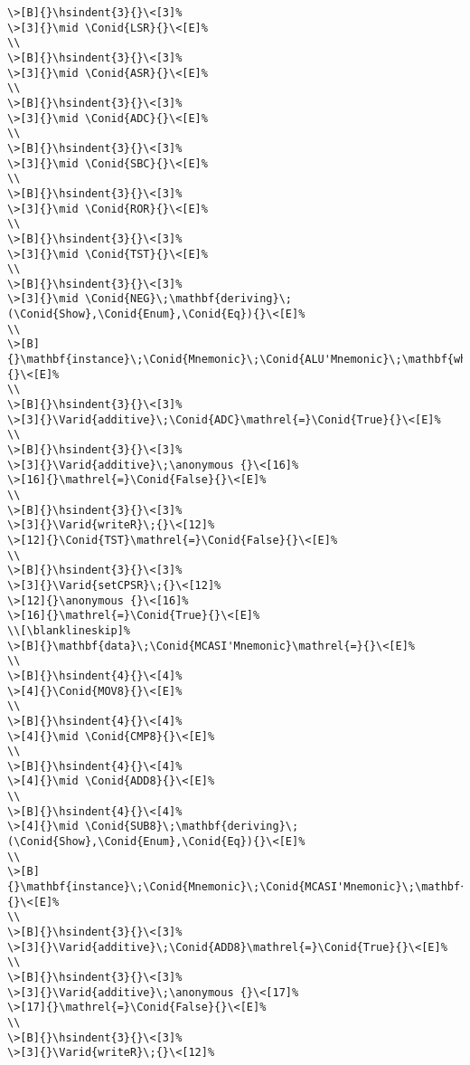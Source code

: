 \documentclass{article}
\makeatletter
\newcommand{\Conid}[1]{\mathit{#1}}
\newcommand{\Varid}[1]{\mathit{#1}}
\newcommand{\anonymous}{\kern0.06em \vbox{\hrule\@width.5em}}
\newlength{\blanklineskip}
\newcommand{\hsindent}[1]{\quad}%
\makeatother
\begin{document}
\begin{Verbatim}[fontsize=\scriptsize]
\>[B]{}\hsindent{3}{}\<[3]%
\>[3]{}\mid \Conid{LSR}{}\<[E]%
\\
\>[B]{}\hsindent{3}{}\<[3]%
\>[3]{}\mid \Conid{ASR}{}\<[E]%
\\
\>[B]{}\hsindent{3}{}\<[3]%
\>[3]{}\mid \Conid{ADC}{}\<[E]%
\\
\>[B]{}\hsindent{3}{}\<[3]%
\>[3]{}\mid \Conid{SBC}{}\<[E]%
\\
\>[B]{}\hsindent{3}{}\<[3]%
\>[3]{}\mid \Conid{ROR}{}\<[E]%
\\
\>[B]{}\hsindent{3}{}\<[3]%
\>[3]{}\mid \Conid{TST}{}\<[E]%
\\
\>[B]{}\hsindent{3}{}\<[3]%
\>[3]{}\mid \Conid{NEG}\;\mathbf{deriving}\;(\Conid{Show},\Conid{Enum},\Conid{Eq}){}\<[E]%
\\
\>[B]{}\mathbf{instance}\;\Conid{Mnemonic}\;\Conid{ALU'Mnemonic}\;\mathbf{where}{}\<[E]%
\\
\>[B]{}\hsindent{3}{}\<[3]%
\>[3]{}\Varid{additive}\;\Conid{ADC}\mathrel{=}\Conid{True}{}\<[E]%
\\
\>[B]{}\hsindent{3}{}\<[3]%
\>[3]{}\Varid{additive}\;\anonymous {}\<[16]%
\>[16]{}\mathrel{=}\Conid{False}{}\<[E]%
\\
\>[B]{}\hsindent{3}{}\<[3]%
\>[3]{}\Varid{writeR}\;{}\<[12]%
\>[12]{}\Conid{TST}\mathrel{=}\Conid{False}{}\<[E]%
\\
\>[B]{}\hsindent{3}{}\<[3]%
\>[3]{}\Varid{setCPSR}\;{}\<[12]%
\>[12]{}\anonymous {}\<[16]%
\>[16]{}\mathrel{=}\Conid{True}{}\<[E]%
\\[\blanklineskip]%
\>[B]{}\mathbf{data}\;\Conid{MCASI'Mnemonic}\mathrel{=}{}\<[E]%
\\
\>[B]{}\hsindent{4}{}\<[4]%
\>[4]{}\Conid{MOV8}{}\<[E]%
\\
\>[B]{}\hsindent{4}{}\<[4]%
\>[4]{}\mid \Conid{CMP8}{}\<[E]%
\\
\>[B]{}\hsindent{4}{}\<[4]%
\>[4]{}\mid \Conid{ADD8}{}\<[E]%
\\
\>[B]{}\hsindent{4}{}\<[4]%
\>[4]{}\mid \Conid{SUB8}\;\mathbf{deriving}\;(\Conid{Show},\Conid{Enum},\Conid{Eq}){}\<[E]%
\\
\>[B]{}\mathbf{instance}\;\Conid{Mnemonic}\;\Conid{MCASI'Mnemonic}\;\mathbf{where}{}\<[E]%
\\
\>[B]{}\hsindent{3}{}\<[3]%
\>[3]{}\Varid{additive}\;\Conid{ADD8}\mathrel{=}\Conid{True}{}\<[E]%
\\
\>[B]{}\hsindent{3}{}\<[3]%
\>[3]{}\Varid{additive}\;\anonymous {}\<[17]%
\>[17]{}\mathrel{=}\Conid{False}{}\<[E]%
\\
\>[B]{}\hsindent{3}{}\<[3]%
\>[3]{}\Varid{writeR}\;{}\<[12]%

\end{Verbatim}
\end{document}
